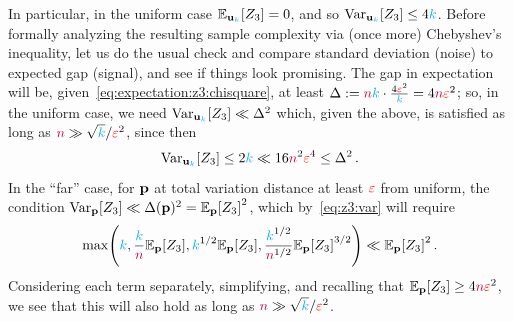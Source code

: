 In particular, in the uniform case $\bE{\uniform_\ab}{Z_3} = 0$, and so $\operatorname{Var}_{\mathbf{u}_{\textcolor{cyan}{k}}}[Z_3] \leq 4{\textcolor{cyan}{k}}$. Before formally analyzing the resulting sample complexity via (once more) Chebyshev's inequality, let us do the usual check and compare standard deviation (noise) to expected gap (signal), and see if things look promising. The gap in expectation will be, given~\cref{eq:expectation:z3:chisquare}, at least $\Delta := {\textcolor{purple}{n}}{\textcolor{cyan}{k}} \cdot \frac{4\textcolor{red}{\varepsilon}^2}{{\textcolor{cyan}{k}}} = 4{\textcolor{purple}{n}}\textcolor{red}{\varepsilon}^2$; so, in the uniform case, we need
$\operatorname{Var}_{\mathbf{u}_{\textcolor{cyan}{k}}}[Z_3] \ll \Delta^2$ which, given the above, is satisfied as long as ${\textcolor{purple}{n}} \gg \sqrt{{\textcolor{cyan}{k}}}/{\textcolor{red}{\varepsilon}^2}$, since then
\[
    \operatorname{Var}_{\mathbf{u}_{\textcolor{cyan}{k}}}[Z_3] \leq 2{\textcolor{cyan}{k}} \ll 16{\textcolor{purple}{n}}^2\textcolor{red}{\varepsilon}^4 \leq \Delta^2\,.
\]
In the ``far'' case, for $\mathbf{p}$ at total variation distance at least $\textcolor{red}{\varepsilon}$ from uniform, the condition $\Var_\p[Z_3] \ll \Delta(\p)^2 = \bE{\p}{Z_3}^2$, which by~\cref{eq:z3:var} will require
\[
    \max\Paren{\ab, \frac{\ab}{\ns}\bE{\p}{Z_3}, \ab^{1/2}\bE{\p}{Z_3} , \frac{\ab^{1/2}}{\ns^{1/2}}\bE{\p}{Z_3}^{3/2} } \ll \bE{\p}{Z_3}^2\,.
\]
Considering each term separately, simplifying, and recalling that $\bE{\p}{Z_3} \geq 4\ns\dst^2$, we see that this will also hold as long as ${\textcolor{purple}{n}} \gg \sqrt{{\textcolor{cyan}{k}}}/{\textcolor{red}{\varepsilon}^2}$.

